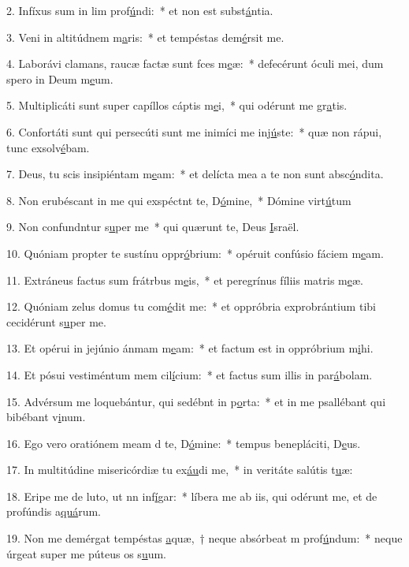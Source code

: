 2. Infíxus sum in lim prof\uline{ú}ndi:~* et non est subst\uline{á}ntia.\par 
3. Veni in altitúdnem m\uline{a}ris:~* et tempéstas dem\uline{é}rsit me.\par 
4. Laborávi clamans, raucæ factæ sunt fces m\uline{e}æ:~* defecérunt óculi mei, dum spero in Deum m\uline{e}um.\par 
5. Multiplicáti sunt super capíllos cáptis m\uline{e}i,~* qui odérunt me gr\uline{a}tis.\par 
6. Confortáti sunt qui persecúti sunt me inimíci me inj\uline{ú}ste:~* quæ non rápui, tunc exsolv\uline{é}bam.\par 
7. Deus, tu scis insipiéntam m\uline{e}am:~* et delícta mea a te non sunt absc\uline{ó}ndita.\par 
8. Non erubéscant in me qui exspéctnt te, D\uline{ó}mine,~* Dómine virt\uline{ú}tum\par 
9. Non confundntur s\uline{u}per me~* qui quærunt te, Deus \uline{I}sraël.\par 
10. Quóniam propter te sustínu oppr\uline{ó}brium:~* opéruit confúsio fáciem m\uline{e}am.\par 
11. Extráneus factus sum frátrbus m\uline{e}is,~* et peregrínus fíliis matris m\uline{e}æ.\par 
12. Quóniam zelus domus tu com\uline{é}dit me:~* et oppróbria exprobrántium tibi cecidérunt s\uline{u}per me.\par 
13. Et opérui in jejúnio ánmam m\uline{e}am:~* et factum est in oppróbrium m\uline{i}hi.\par 
14. Et pósui vestiméntum mem cil\uline{í}cium:~* et factus sum illis in par\uline{á}bolam.\par 
15. Advérsum me loquebántur, qui sedébnt in p\uline{o}rta:~* et in me psallébant qui bibébant v\uline{i}num.\par 
16. Ego vero oratiónem meam d te, D\uline{ó}mine:~* tempus benepláciti, D\uline{e}us.\par 
17. In multitúdine misericórdiæ tu ex\uline{áu}di me,~* in veritáte salútis t\uline{u}æ:\par 
18. Eripe me de luto, ut nn inf\uline{í}gar:~* líbera me ab iis, qui odérunt me, et de profúndis a\uline{quá}rum.\par 
19. Non me demérgat tempéstas \uline{a}quæ,~† neque absórbeat m prof\uline{ú}ndum:~* neque úrgeat super me púteus os s\uline{u}um.\par 
